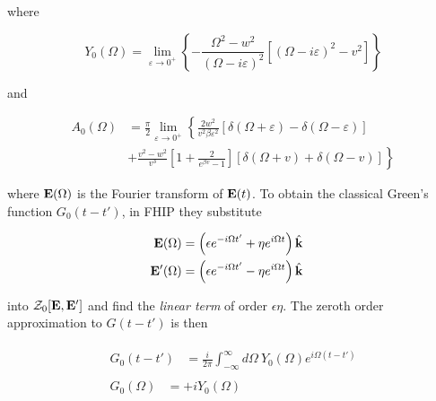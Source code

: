 where

\begin{equation}
    Y_0(\Omega) = \lim_{\varepsilon \to 0^+} \left\{ -\frac{\Omega^2 - w^2}{(\Omega - i\varepsilon)^2} \left[ (\Omega - i\varepsilon)^2 - v^2 \right]\right\}
\end{equation}

and

\begin{equation}
    \begin{aligned}
        A_0(\Omega) &= \frac{\pi}{2} \lim_{\varepsilon \to 0^+} \left\{ \frac{2w^2}{v^2\beta\varepsilon^2} \left[ \delta(\Omega + \varepsilon) - \delta(\Omega - \varepsilon) \right] \right. \\
        &\left. + \frac{v^2 - w^2}{v^3} \left[ 1 + \frac{2}{e^{\beta v} - 1} \right] \left[ \delta(\Omega + v) + \delta(\Omega - v) \right] \right\}
    \end{aligned}
\end{equation}

where $\vb{E}(\Omega)$ is the Fourier transform of $\vb{E}(t)$. To obtain the classical Green's function $G_0(t-t')$, in FHIP they substitute

\begin{subequations}
\begin{align}
    \begin{split}
        \vb{E}(\Omega)& = \left(\epsilon e^{-i\Omega t'} + \eta e^{i \Omega t}\right) \hat{\vb{k}}
    \end{split}\\
    \begin{split}
        \vb{E'}(\Omega) &= \left(\epsilon e^{-i\Omega t'} - \eta e^{i \Omega t} \right) \hat{\vb{k}}
    \end{split}
\end{align}
\end{subequations}

into $\mathcal{Z}_0[\vb{E}, \vb{E'}]$ and find the \emph{linear term} of order $\epsilon \eta$. The zeroth order approximation to $G(t - t')$ is then

\begin{subequations}
\begin{align}
    \begin{split}
    G_0(t - t') &= \frac{i}{2\pi} \int^\infty_{-\infty} d\Omega\ Y_0(\Omega) e^{i\Omega(t - t')} 
    \end{split}\\
    \begin{split}
    G_0(\Omega) &= +i Y_0(\Omega)
\end{split}
\end{align}
\end{subequations}

